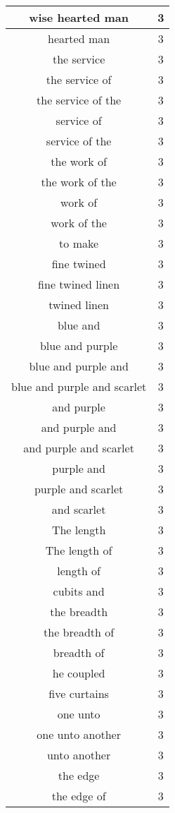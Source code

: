 \begin{center}
\begin{longtable}{|c|c|}
wise hearted man & 3\\ \hline 
hearted man & 3\\ \hline 
the service & 3\\ \hline 
the service of & 3\\ \hline 
the service of the & 3\\ \hline 
service of & 3\\ \hline 
service of the & 3\\ \hline 
the work of & 3\\ \hline 
the work of the & 3\\ \hline 
work of & 3\\ \hline 
work of the & 3\\ \hline 
to make & 3\\ \hline 
fine twined & 3\\ \hline 
fine twined linen & 3\\ \hline 
twined linen & 3\\ \hline 
blue and & 3\\ \hline 
blue and purple & 3\\ \hline 
blue and purple and & 3\\ \hline 
blue and purple and scarlet & 3\\ \hline 
and purple & 3\\ \hline 
and purple and & 3\\ \hline 
and purple and scarlet & 3\\ \hline 
purple and & 3\\ \hline 
purple and scarlet & 3\\ \hline 
and scarlet & 3\\ \hline 
The length & 3\\ \hline 
The length of & 3\\ \hline 
length of & 3\\ \hline 
cubits and & 3\\ \hline 
the breadth & 3\\ \hline 
the breadth of & 3\\ \hline 
breadth of & 3\\ \hline 
he coupled & 3\\ \hline 
five curtains & 3\\ \hline 
one unto & 3\\ \hline 
one unto another & 3\\ \hline 
unto another & 3\\ \hline 
the edge & 3\\ \hline 
the edge of & 3\\ \hline 

\end{longtable}
\end{center}
